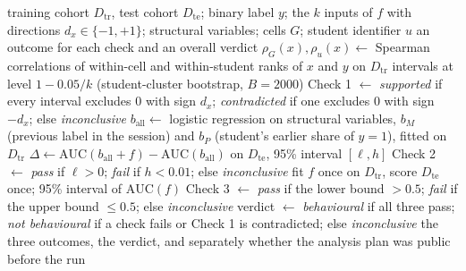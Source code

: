 

\begin{algorithm}[H]
\caption{Audit of a rule model $f$ on interaction data}
\begin{algorithmic}[1]
\Require training cohort $D_{\mathrm{tr}}$, test cohort $D_{\mathrm{te}}$; binary label $y$; the $k$ inputs of $f$ with directions $d_x \in \{-1,+1\}$; structural variables; cells $G$; student identifier $u$
\Ensure an outcome for each check and an overall verdict
 
  \State $\rho_G(x), \rho_u(x) \gets$ Spearman correlations of within-cell and within-student ranks of $x$ and $y$ on $D_{\mathrm{tr}}$
  \State intervals at level $1 - 0.05/k$ (student-cluster bootstrap, $B = 2000$)
\EndFor
\State Check 1 $\gets$ \emph{supported} if every interval excludes 0 with sign $d_x$; \emph{contradicted} if one excludes 0 with sign $-d_x$; else \emph{inconclusive}
\State $b_{\mathrm{all}} \gets$ logistic regression on structural variables, $b_M$ (previous label in the session) and $b_P$ (student's earlier share of $y=1$), fitted on $D_{\mathrm{tr}}$ 
\State $\Delta \gets \mathrm{AUC}(b_{\mathrm{all}} + f) - \mathrm{AUC}(b_{\mathrm{all}})$ on $D_{\mathrm{te}}$, 95\% interval $[\ell, h]$
\State Check 2 $\gets$ \emph{pass} if $\ell > 0$; \emph{fail} if $h < 0.01$; else \emph{inconclusive}
\State fit $f$ once on $D_{\mathrm{tr}}$, score $D_{\mathrm{te}}$ once; 95\% interval of $\mathrm{AUC}(f)$ 
\State Check 3 $\gets$ \emph{pass} if the lower bound $> 0.5$; \emph{fail} if the upper bound $\le 0.5$; else \emph{inconclusive}
\State verdict $\gets$ \emph{behavioural} if all three pass; \emph{not behavioural} if a check fails or Check 1 is contradicted; else \emph{inconclusive}
\State \Return the three outcomes, the verdict, and separately whether the analysis plan was public before the run
\end{algorithmic}
\end{algorithm}

